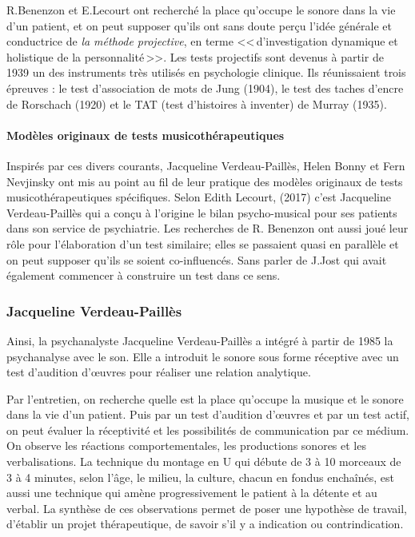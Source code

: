  	 
        R.Benenzon et E.Lecourt ont  recherché la place qu'occupe le sonore dans la vie d'un 
        patient, et on peut supposer qu'ils ont sans doute perçu l'idée générale et 
        conductrice de \emph{la méthode projective}, 
        en terme 
	    <<\,d'investigation dynamique et holistique de la
        personnalité\,>>. Les tests projectifs sont devenus à partir
        de 1939 un des instruments très utilisés en psychologie
        clinique. Ils réunissaient trois épreuves : le test
        d'association de mots de Jung (1904), le test des taches
        d'encre de Rorschach (1920) et le TAT (test d'histoires à
        inventer) de Murray (1935)\autocite[ch.~1, p.~13]{anzieu.chabert:methodes}.
		

	
\paragraph{Modèles originaux de tests musicothérapeutiques}

Inspirés par ces divers courants, Jacqueline Verdeau-Paillès, Helen Bonny et Fern Nevjinsky ont mis au point au fil de leur
pratique des modèles originaux de tests musicothérapeutiques
spécifiques. Selon Edith Lecourt,
(2017)\autocite[ch.~3, p.~84]{Les arts-thérapies,Ed.Armand-Colin}
c'est Jacqueline Verdeau-Paillès qui a conçu à
l'origine le bilan psycho-musical pour ses patients dans son service
de psychiatrie. Les recherches de R.
Benenzon ont aussi joué leur rôle \autocite{benenzon:musicotherapie}  pour l'élaboration d'un
test similaire; elles se passaient quasi en
parallèle et on peut supposer qu'ils se soient co-influencés. Sans
parler de J.Jost qui avait également commencer à construire un test dans ce sens.




\subsubsection{Jacqueline Verdeau-Paillès}

 Ainsi, la psychanalyste Jacqueline Verdeau-Paillès a 
intégré à partir de 1985 la psychanalyse avec le son. Elle a  introduit
 le sonore 
sous forme réceptive avec un test d'audition d'\oe uvres pour réaliser
une relation analytique\autocite{verdeau-pailles:bilan}.

Par l'entretien, on recherche quelle est la place qu'occupe la
musique et le sonore dans la vie d'un patient. Puis par un test
d'audition d'\oe uvres et par un test actif, on peut évaluer la
réceptivité et les possibilités de communication par ce médium. On
observe les réactions comportementales, les productions sonores et les
verbalisations. La technique du montage en U qui débute de 3 à 10
morceaux de 3 à 4 minutes, selon l'âge, le milieu, la culture, chacun
en fondus enchaînés, est aussi une technique qui amène progressivement le patient à la détente
et au verbal.
La synthèse de ces observations permet de poser une hypothèse de
travail, d'établir un projet thérapeutique, de savoir s'il y a
indication ou contrindication.





